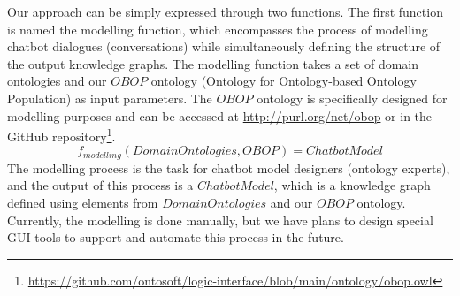 \documentclass[runningheads]{llncs}
\begin{document}
Our approach can be simply expressed through two functions. The first function is named the modelling function, which encompasses the process of modelling chatbot dialogues (conversations) while simultaneously defining the structure of the output knowledge graphs. The modelling function takes a set of domain ontologies and our $OBOP$ ontology (Ontology for Ontology-based Ontology Population) as input parameters. The $OBOP$ ontology is specifically designed for modelling purposes and can be accessed at \url{http://purl.org/net/obop} or in the GitHub repository\footnote{\url{https://github.com/ontosoft/logic-interface/blob/main/ontology/obop.owl}}.
$$ f_{modelling}(DomainOntologies, OBOP) = ChatbotModel$$
The modelling process is the task for chatbot model designers (ontology experts), and the output of this process is a $ChatbotModel$, which is a knowledge graph defined using elements from $DomainOntologies$ and our $OBOP$ ontology. Currently, the modelling is done manually, but we have plans to design special GUI tools to support and automate this process in the future.  
\end{document}
